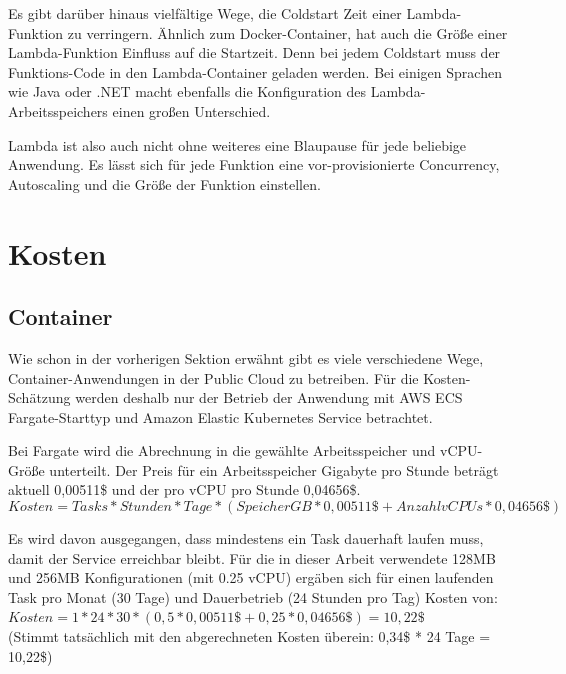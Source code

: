 Es gibt darüber hinaus vielfältige Wege, die Coldstart Zeit einer Lambda-Funktion zu verringern. Ähnlich zum Docker-Container, hat auch die Größe einer Lambda-Funktion Einfluss auf die Startzeit. Denn bei jedem Coldstart muss der Funktions-Code in den Lambda-Container geladen werden. Bei einigen Sprachen wie Java oder .NET macht ebenfalls die Konfiguration des Lambda-Arbeitsspeichers einen großen Unterschied\cite{malishev_aws_2019}. 

Lambda ist also auch nicht ohne weiteres eine Blaupause für jede beliebige Anwendung. Es lässt sich für jede Funktion eine vor-provisionierte Concurrency, Autoscaling und die Größe der Funktion einstellen. 

\section{Kosten}

\subsection{Container}
Wie schon in der vorherigen Sektion erwähnt gibt es viele verschiedene Wege, Container-Anwendungen in der Public Cloud zu betreiben. Für die Kosten-Schätzung werden deshalb nur der Betrieb der Anwendung mit AWS ECS Fargate-Starttyp und Amazon Elastic Kubernetes Service betrachtet.

Bei Fargate wird die Abrechnung in die gewählte Arbeitsspeicher und vCPU-Größe unterteilt. Der Preis für ein Arbeitsspeicher Gigabyte pro Stunde beträgt aktuell 0,00511\$ und der pro vCPU pro Stunde 0,04656\$.  \\


\begin{equation}
Kosten = Tasks * Stunden * Tage * (SpeicherGB * 0,00511\$ + AnzahlvCPUs * 0,04656\$)
\end{equation}

Es wird davon ausgegangen, dass mindestens ein Task dauerhaft laufen muss, damit der Service erreichbar bleibt. Für die in dieser Arbeit verwendete 128MB und 256MB Konfigurationen (mit 0.25 vCPU) ergäben sich für einen laufenden Task pro Monat (30 Tage) und Dauerbetrieb (24 Stunden pro Tag) Kosten von: \\

$Kosten = 1 * 24 * 30 * (0,5 * 0,00511\$ + 0,25 * 0,04656\$) = 10,22\$$ \\
(Stimmt tatsächlich mit den abgerechneten Kosten überein: 0,34\$ * 24 Tage = 10,22\$)


